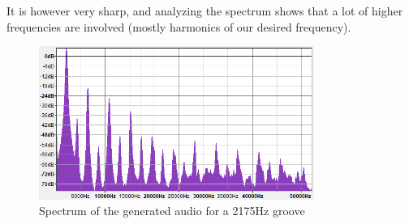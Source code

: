 \documentclass[12pt, twoside]{article}
\begin{document}
It is however very sharp, and analyzing the spectrum shows that a lot of higher frequencies are involved (mostly harmonics of our desired frequency).

\begin{figure}[H]
	\centering
	\includegraphics[width=0.8\textwidth]{../images/spectrometer_2175_v4.png}
	\caption{Spectrum of the generated audio for a 2175Hz groove}
	\label{spectrum2175}
\end{figure}




\end{document}
